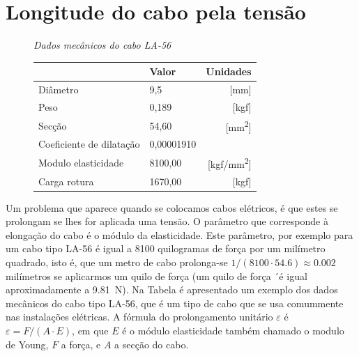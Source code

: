 \section{Longitude do cabo pela tensão}
\label{sec:cable-y-la}

\begin{figure}
  \vspace{-1.5cm}
  \begin{mybox}
    \centering
    \emph{\textcolor{bluesol}{Dados mecânicos do cabo LA-56}}
   \vspace{0.2cm}
   \begin{tabular}{llr}
     \toprule
     &Valor&Unidades\\
     \midrule
     Diâmetro & 9,5 & [\si{mm}]\\
      Peso & 0,189 & [\si{kgf}]\\
      Secção & 54,60 & [\si{mm^2}]\\
      Coeficiente de dilatação & 0,00001910 & \\
      Modulo elasticidade & 8100,00 & [\si{kgf/mm^2}]\\
      Carga rotura & 1670,00 & [\si{kgf}]\\
      \bottomrule
    \end{tabular}
  \end{mybox}
 \vspace{-1cm}
\end{figure}

Um problema que aparece quando se colocamos cabos elétricos, é que estes se prolongam se lhes for aplicada uma tensão. O parâmetro que corresponde à elongação do cabo é o módulo da elasticidade. Este parâmetro, por exemplo para um cabo tipo LA-56 é igual a 8100 quilogramas de força por um milímetro quadrado, isto é, que um metro de cabo prolonga-se  $1/(8100\cdot 54.6)\approx 0.002$ milímetros se aplicarmos um quilo de força (um quilo de força ´é igual aproximadamente a \SI{9.81}{N}). Na Tabela é apresentado um exemplo dos dados mecânicos do cabo tipo LA-56, que é um tipo de cabo que se usa comummente nas instalações elétricas. A fórmula do prolongamento unitário $\varepsilon$ é $\varepsilon=F/(A\cdot E)$,  em que $E$ é o módulo elasticidade também chamado o modulo de Young, $F$ a força, e $A$ a secção do cabo.

